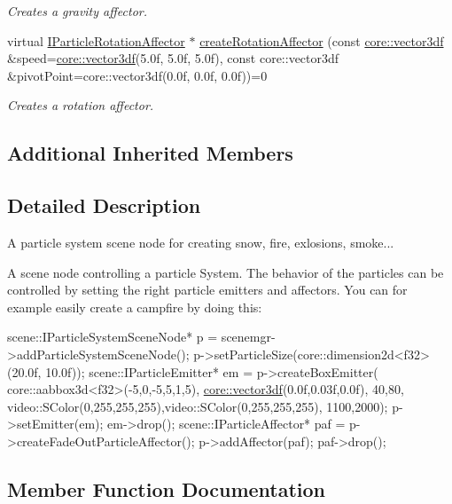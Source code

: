 \begin{DoxyCompactItemize}
\begin{DoxyCompactList}\small\item\em Creates a gravity affector. \end{DoxyCompactList}\item 
virtual \hyperlink{classirr_1_1scene_1_1IParticleRotationAffector}{I\+Particle\+Rotation\+Affector} $\ast$ \hyperlink{classirr_1_1scene_1_1IParticleSystemSceneNode_a7a09b7ebc0d4a2d164233c42689623d6}{create\+Rotation\+Affector} (const \hyperlink{namespaceirr_1_1core_a06f169d08b5c429f5575acb7edbad811}{core\+::vector3df} \&speed=\hyperlink{namespaceirr_1_1core_a06f169d08b5c429f5575acb7edbad811}{core\+::vector3df}(5.\+0f, 5.\+0f, 5.\+0f), const core\+::vector3df \&pivot\+Point=core\+::vector3df(0.\+0f, 0.\+0f, 0.\+0f))=0
\begin{DoxyCompactList}\small\item\em Creates a rotation affector. \end{DoxyCompactList}\end{DoxyCompactItemize}
\subsection*{Additional Inherited Members}


\subsection{Detailed Description}
A particle system scene node for creating snow, fire, exlosions, smoke... 

A scene node controlling a particle System. The behavior of the particles can be controlled by setting the right particle emitters and affectors. You can for example easily create a campfire by doing this\+:


\begin{DoxyCode}
scene::IParticleSystemSceneNode* p = scenemgr->addParticleSystemSceneNode();
p->setParticleSize(core::dimension2d<f32>(20.0f, 10.0f));
scene::IParticleEmitter* em = p->createBoxEmitter(
    core::aabbox3d<f32>(-5,0,-5,5,1,5),
    \hyperlink{namespaceirr_1_1core_a06f169d08b5c429f5575acb7edbad811}{core::vector3df}(0.0f,0.03f,0.0f),
    40,80, video::SColor(0,255,255,255),video::SColor(0,255,255,255), 1100,2000);
p->setEmitter(em);
em->drop();
scene::IParticleAffector* paf = p->createFadeOutParticleAffector();
p->addAffector(paf);
paf->drop();
\end{DoxyCode}
 

\subsection{Member Function Documentation}
\mbox{\label{classirr_1_1scene_1_1IParticleSystemSceneNode_a401f5afbbb748878011c5ceb7d447f8b}} 
